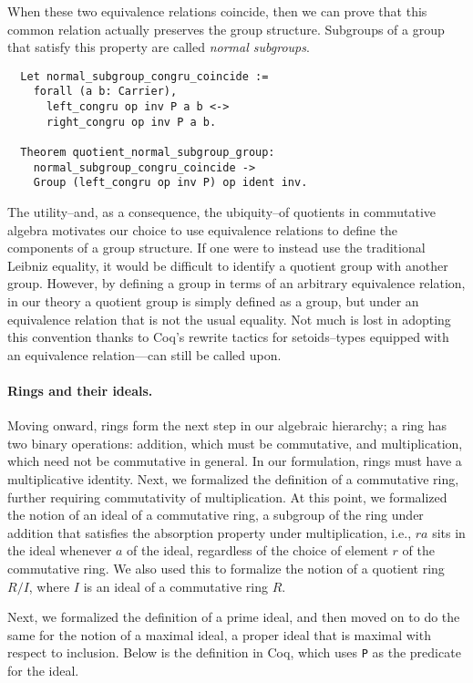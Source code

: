 \documentclass{article}
\begin{document}
When these two equivalence relations coincide, then we can prove that this common
 relation actually preserves the group structure. Subgroups of a group that satisfy 
this property are called \emph{normal subgroups}.

\begin{verbatim}
  Let normal_subgroup_congru_coincide :=
    forall (a b: Carrier),
      left_congru op inv P a b <->
      right_congru op inv P a b.

  Theorem quotient_normal_subgroup_group:
    normal_subgroup_congru_coincide ->
    Group (left_congru op inv P) op ident inv.
\end{verbatim}

The utility--and, as a consequence, the ubiquity--of quotients in commutative algebra 
motivates our choice to use equivalence relations to define the components of a group structure. If one
were to instead use the traditional Leibniz equality, it would be difficult to
identify a quotient group with another group. However, by  defining a group in
terms of an arbitrary equivalence relation, in our theory a quotient group is 
simply defined as a group, but under an equivalence relation that is not the
usual equality. Not much is lost in adopting this convention thanks to Coq's 
rewrite tactics for setoids--types equipped with an equivalence relation---can 
still be called
upon.

\paragraph{Rings and their ideals.}
Moving onward, rings form the next step in our algebraic hierarchy; a ring has
two binary operations: addition, which must be commutative, and multiplication,
which need not be commutative in general. In our formulation, rings must have a
multiplicative identity. Next, we formalized the definition of a commutative
ring, further requiring commutativity of multiplication. At this point, we
formalized the notion of an ideal of a commutative ring, a subgroup of the ring
under addition that satisfies the absorption property under multiplication,
i.e., \(r a\) sits in the ideal whenever \(a\) of the ideal, regardless of the choice of 
element \(r\) of the commutative ring. We also used this to formalize the
notion of a quotient ring $R/I$, where $I$ is an ideal of a commutative ring
$R$.

Next, we formalized the definition of a  prime ideal, and then 
moved on to do the same for the notion of a maximal ideal, a proper ideal 
that is maximal with respect to inclusion. Below is the definition in Coq,
which uses \texttt{P} as the predicate for the ideal.
\end{document}

